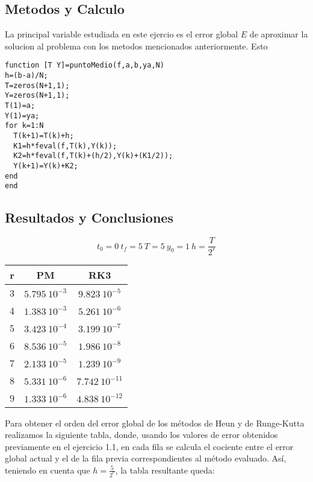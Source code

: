 \documentclass{article}
\begin{document}
\subsection*{Metodos y Calculo}
La principal variable estudiada en este ejercio es el error global $E$ de aproximar la solucion al problema con los metodos mencionados anteriormente. Esto

\begin{verbatim}
function [T Y]=puntoMedio(f,a,b,ya,N)
h=(b-a)/N;
T=zeros(N+1,1);
Y=zeros(N+1,1);
T(1)=a;
Y(1)=ya;
for k=1:N
  T(k+1)=T(k)+h;
  K1=h*feval(f,T(k),Y(k));
  K2=h*feval(f,T(k)+(h/2),Y(k)+(K1/2));
  Y(k+1)=Y(k)+K2;
end
end
\end{verbatim}

\subsection*{Resultados y Conclusiones}

\[
t_0 = 0\
t_f = 5\
T = 5\
y_0 = 1\
h = \frac{T}{2^r}
\]



\begin{center}
\begin{tabular}{||c c c||}
 \hline
 r & PM & RK3 \\ [0.5ex]
 \hline\hline
 3 & $5.795\ 10^{-3}$ & $9.823\ 10^{-5}$ \\
 \hline
 4 & $1.383\ 10^{-3}$ & $5.261\ 10^{-6}$ \\
 \hline
 5 & $3.423\ 10^{-4}$ & $3.199\ 10^{-7}$ \\
 \hline
 6 & $8.536\ 10^{-5}$ & $1.986\ 10^{-8}$ \\
 \hline
 7 & $2.133\ 10^{-5}$ & $1.239\ 10^{-9}$ \\
 \hline
 8 & $5.331\ 10^{-6}$ & $7.742\ 10^{-11}$ \\
 \hline
 9 & $1.333\ 10^{-6}$ & $4.838\ 10^{-12}$ \\ [1ex]
 \hline
\end{tabular}
\end{center}

Para obtener el orden del error global de los métodos de Heun y de Runge-Kutta realizamos la siguiente tabla, donde, usando los valores de error obtenidos previamente en el ejercicio 1.1, en cada fila se calcula el cociente entre el error global actual y el de la fila previa correspondientes al método evaluado. Así, teniendo en cuenta que $h=\frac{5}{2^{r}}$, la tabla resultante queda:
\end{document}
